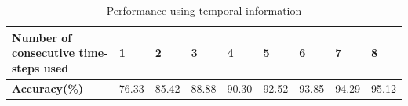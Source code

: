 \documentclass{article}
\begin{document}
\begin{table}[ht]
\small
\caption{Performance using temporal information}
\begin{center}
     \begin{tabular}{ | p{4cm} | l | l | l | l | l | l | l | l |} \hline
     \textbf{Number of consecutive time-steps used} & \textbf{1} & \textbf{2} & \textbf{3} & \textbf{4} & \textbf{5} & \textbf{6} & \textbf{7} & \textbf{8} \\ \hline
     \textbf{Accuracy(\%)} & 76.33 & 85.42 & 88.88 & 90.30 & 92.52 & 93.85 & 94.29 & 95.12\\ \hline
     \end{tabular}
     \label{table:temporal_performance}
\end{center}
\end{table}


\end{document}
